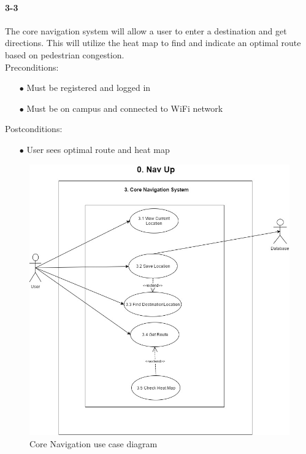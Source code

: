 \documentclass[a4paper,12pt]{article}
\begin{document}
\paragraph{3-3}
The core navigation system will allow a user to enter a destination and get directions. This will utilize the heat map to find and indicate an optimal route based on pedestrian congestion.\\
Preconditions:
\begin{itemize}
	\item[$\bullet$] Must be registered and logged in
	\item[$\bullet$] Must be on campus and connected to WiFi network
\end{itemize}
Postconditions:
\begin{itemize}
	\item[$\bullet$] User sees optimal route and heat map
\end{itemize}
\begin{figure}[H]
\includegraphics[width=\textwidth]{UseCaseDiagrams/CoreNavUCD.JPG}
\caption{Core Navigation use case diagram}
\label{fig:Core Navigation Use Case Diagram}
\end{figure}
\end{document}
